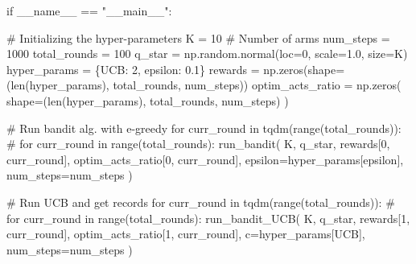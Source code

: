 \documentclass[
  letterpaper,
]{krantz}
\makeatletter
\newenvironment{Shaded}{\begin{snugshade}}{\end{snugshade}}
\newcommand{\BuiltInTok}[1]{\textcolor[rgb]{0.00,0.23,0.31}{#1}}
\newcommand{\CommentTok}[1]{\textcolor[rgb]{0.37,0.37,0.37}{#1}}
\newcommand{\ControlFlowTok}[1]{\textcolor[rgb]{0.00,0.23,0.31}{#1}}
\newcommand{\DecValTok}[1]{\textcolor[rgb]{0.68,0.00,0.00}{#1}}
\newcommand{\FloatTok}[1]{\textcolor[rgb]{0.68,0.00,0.00}{#1}}
\newcommand{\KeywordTok}[1]{\textcolor[rgb]{0.00,0.23,0.31}{#1}}
\newcommand{\NormalTok}[1]{\textcolor[rgb]{0.00,0.23,0.31}{#1}}
\newcommand{\OperatorTok}[1]{\textcolor[rgb]{0.37,0.37,0.37}{#1}}
\newcommand{\StringTok}[1]{\textcolor[rgb]{0.13,0.47,0.30}{#1}}
\newcommand{\VariableTok}[1]{\textcolor[rgb]{0.07,0.07,0.07}{#1}}
\newenvironment{kframe}{%
\medskip{}
\setlength{\fboxsep}{.8em}
 \def\at@end@of@kframe{}%
 \ifinner\ifhmode%
  \def\at@end@of@kframe{\end{minipage}}%
  \begin{minipage}{\columnwidth}%
 \fi\fi%
 \def\FrameCommand##1{\hskip\@totalleftmargin \hskip-\fboxsep
 \colorbox{shadecolor}{##1}\hskip-\fboxsep
     \hskip-\linewidth \hskip-\@totalleftmargin \hskip\columnwidth}%
 \MakeFramed {\advance\hsize-\width
   \@totalleftmargin\z@ \linewidth\hsize
   \@setminipage}}%
 {\par\unskip\endMakeFramed%
 \at@end@of@kframe}
\renewenvironment{Shaded}{\begin{kframe}}{\end{kframe}}
\theoremstyle{plain}
\theoremstyle{definition}
\theoremstyle{definition}
\theoremstyle{remark}
\makeatother
\begin{document}
\begin{codelisting}
\begin{Shaded}
\begin{Highlighting}[]
\ControlFlowTok{if} \VariableTok{\_\_name\_\_} \OperatorTok{==} \StringTok{"\_\_main\_\_"}\NormalTok{:}
    
    \CommentTok{\# Initializing the hyper{-}parameters}
\NormalTok{    K }\OperatorTok{=} \DecValTok{10}  \CommentTok{\# Number of arms}
\NormalTok{    num\_steps }\OperatorTok{=} \DecValTok{1000}
\NormalTok{    total\_rounds }\OperatorTok{=} \DecValTok{100}
\NormalTok{    q\_star }\OperatorTok{=}\NormalTok{ np.random.normal(loc}\OperatorTok{=}\DecValTok{0}\NormalTok{, scale}\OperatorTok{=}\FloatTok{1.0}\NormalTok{, size}\OperatorTok{=}\NormalTok{K)}
\NormalTok{    hyper\_params }\OperatorTok{=}\NormalTok{ \{}\StringTok{\textquotesingle{}UCB\textquotesingle{}}\NormalTok{: }\DecValTok{2}\NormalTok{, }\StringTok{\textquotesingle{}epsilon\textquotesingle{}}\NormalTok{: }\FloatTok{0.1}\NormalTok{\}}
\NormalTok{    rewards }\OperatorTok{=}\NormalTok{ np.zeros(shape}\OperatorTok{=}\NormalTok{(}\BuiltInTok{len}\NormalTok{(hyper\_params), total\_rounds, num\_steps))}
\NormalTok{    optim\_acts\_ratio }\OperatorTok{=}\NormalTok{ np.zeros(}
\NormalTok{            shape}\OperatorTok{=}\NormalTok{(}\BuiltInTok{len}\NormalTok{(hyper\_params), total\_rounds, num\_steps)}
\NormalTok{            )}
    
    \CommentTok{\# Run bandit alg. with e{-}greedy}
    \ControlFlowTok{for}\NormalTok{ curr\_round }\KeywordTok{in}\NormalTok{ tqdm(}\BuiltInTok{range}\NormalTok{(total\_rounds)):}
        \CommentTok{\# for curr\_round in range(total\_rounds):}
\NormalTok{        run\_bandit(}
\NormalTok{                K,}
\NormalTok{                q\_star,}
\NormalTok{                rewards[}\DecValTok{0}\NormalTok{, curr\_round],}
\NormalTok{                optim\_acts\_ratio[}\DecValTok{0}\NormalTok{, curr\_round],}
\NormalTok{                epsilon}\OperatorTok{=}\NormalTok{hyper\_params[}\StringTok{\textquotesingle{}epsilon\textquotesingle{}}\NormalTok{],}
\NormalTok{                num\_steps}\OperatorTok{=}\NormalTok{num\_steps}
\NormalTok{                )}
    
    \CommentTok{\# Run UCB and get records}
    \ControlFlowTok{for}\NormalTok{ curr\_round }\KeywordTok{in}\NormalTok{ tqdm(}\BuiltInTok{range}\NormalTok{(total\_rounds)):}
        \CommentTok{\# for curr\_round in range(total\_rounds):}
\NormalTok{        run\_bandit\_UCB(}
\NormalTok{                K,}
\NormalTok{                q\_star,}
\NormalTok{                rewards[}\DecValTok{1}\NormalTok{, curr\_round],}
\NormalTok{                optim\_acts\_ratio[}\DecValTok{1}\NormalTok{, curr\_round],}
\NormalTok{                c}\OperatorTok{=}\NormalTok{hyper\_params[}\StringTok{\textquotesingle{}UCB\textquotesingle{}}\NormalTok{],}
\NormalTok{                num\_steps}\OperatorTok{=}\NormalTok{num\_steps}
\NormalTok{                )}
    

\end{Highlighting}
\end{Shaded}
\end{codelisting}
\end{document}
